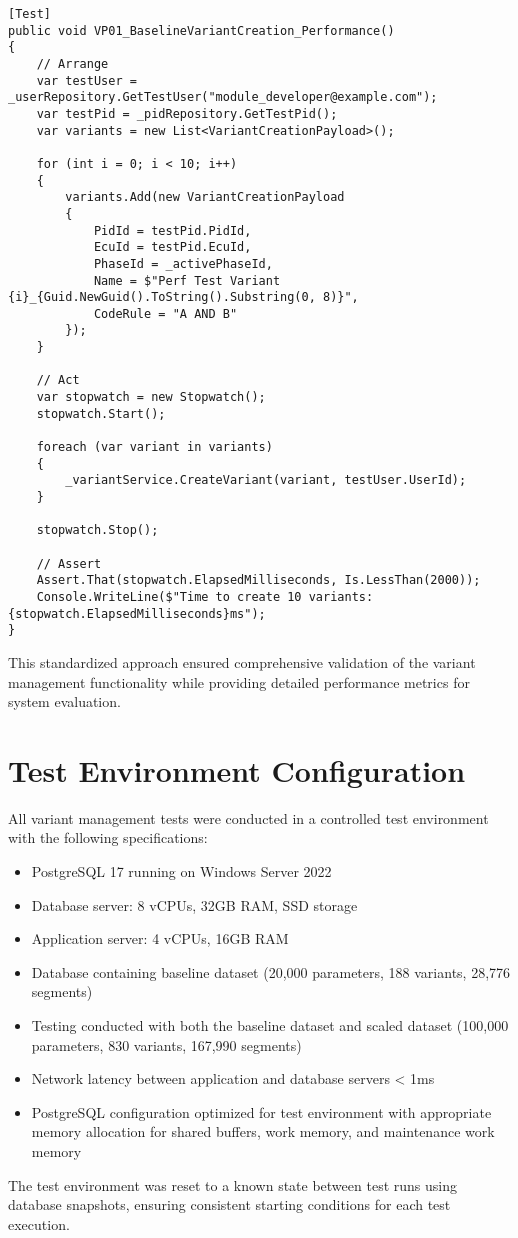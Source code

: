 \begin{lstlisting}[language=CSharp, caption={Performance Test Implementation Example}, label={lst:performance-test}]
[Test]
public void VP01_BaselineVariantCreation_Performance()
{
    // Arrange
    var testUser = _userRepository.GetTestUser("module_developer@example.com");
    var testPid = _pidRepository.GetTestPid();
    var variants = new List<VariantCreationPayload>();
    
    for (int i = 0; i < 10; i++)
    {
        variants.Add(new VariantCreationPayload
        {
            PidId = testPid.PidId,
            EcuId = testPid.EcuId,
            PhaseId = _activePhaseId,
            Name = $"Perf Test Variant {i}_{Guid.NewGuid().ToString().Substring(0, 8)}",
            CodeRule = "A AND B"
        });
    }
    
    // Act
    var stopwatch = new Stopwatch();
    stopwatch.Start();
    
    foreach (var variant in variants)
    {
        _variantService.CreateVariant(variant, testUser.UserId);
    }
    
    stopwatch.Stop();
    
    // Assert
    Assert.That(stopwatch.ElapsedMilliseconds, Is.LessThan(2000));
    Console.WriteLine($"Time to create 10 variants: {stopwatch.ElapsedMilliseconds}ms");
}
\end{lstlisting}

This standardized approach ensured comprehensive validation of the variant management functionality while providing detailed performance metrics for system evaluation.

\section{Test Environment Configuration}
\label{sec:test-environment-config}

All variant management tests were conducted in a controlled test environment with the following specifications:

\begin{itemize}
    \item PostgreSQL 17 running on Windows Server 2022
    \item Database server: 8 vCPUs, 32GB RAM, SSD storage
    \item Application server: 4 vCPUs, 16GB RAM
    \item Database containing baseline dataset (20,000 parameters, 188 variants, 28,776 segments)
    \item Testing conducted with both the baseline dataset and scaled dataset (100,000 parameters, 830 variants, 167,990 segments)
    \item Network latency between application and database servers < 1ms
    \item PostgreSQL configuration optimized for test environment with appropriate memory allocation for shared buffers, work memory, and maintenance work memory
\end{itemize}

The test environment was reset to a known state between test runs using database snapshots, ensuring consistent starting conditions for each test execution.